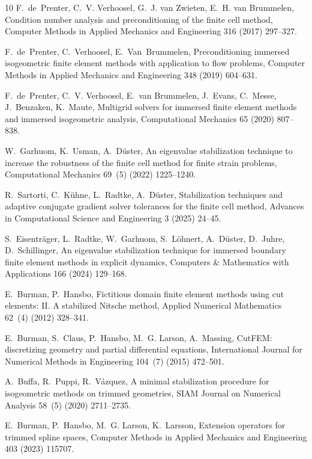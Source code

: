 \documentclass{article}
\numberwithin{equation}{section}
\theoremstyle{definition}
\begin{document}
\begin{thebibliography}{10}
F.~de~Prenter, C.~V. Verhoosel, G.~J. van Zwieten, E.~H. van Brummelen, Condition number analysis and preconditioning of the finite cell method, Computer Methods in Applied Mechanics and Engineering 316 (2017) 297--327.

F.~de~Prenter, C.~Verhoosel, E.~Van~Brummelen, Preconditioning immersed isogeometric finite element methods with application to flow problems, Computer Methods in Applied Mechanics and Engineering 348 (2019) 604--631.

F.~de~Prenter, C.~V. Verhoosel, E.~van Brummelen, J.~Evans, C.~Messe, J.~Benzaken, K.~Maute, Multigrid solvers for immersed finite element methods and immersed isogeometric analysis, Computational Mechanics 65 (2020) 807--838.

W.~Garhuom, K.~Usman, A.~D{\"u}ster, An eigenvalue stabilization technique to increase the robustness of the finite cell method for finite strain problems, Computational Mechanics 69~(5) (2022) 1225--1240.

R.~Sartorti, C.~K{\"u}hne, L.~Radtke, A.~D{\"u}ster, Stabilization techniques and adaptive conjugate gradient solver tolerances for the finite cell method, Advances in Computational Science and Engineering 3 (2025) 24--45.

S.~Eisentr{\"a}ger, L.~Radtke, W.~Garhuom, S.~L{\"o}hnert, A.~D{\"u}ster, D.~Juhre, D.~Schillinger, An eigenvalue stabilization technique for immersed boundary finite element methods in explicit dynamics, Computers \& Mathematics with Applications 166 (2024) 129--168.

E.~Burman, P.~Hansbo, Fictitious domain finite element methods using cut elements: {II}. {A} stabilized {Nitsche} method, Applied Numerical Mathematics 62~(4) (2012) 328--341.

E.~Burman, S.~Claus, P.~Hansbo, M.~G. Larson, A.~Massing, {CutFEM}: discretizing geometry and partial differential equations, International Journal for Numerical Methods in Engineering 104~(7) (2015) 472--501.

A.~Buffa, R.~Puppi, R.~V{\'a}zquez, A minimal stabilization procedure for isogeometric methods on trimmed geometries, SIAM Journal on Numerical Analysis 58~(5) (2020) 2711--2735.

E.~Burman, P.~Hansbo, M.~G. Larson, K.~Larsson, Extension operators for trimmed spline spaces, Computer Methods in Applied Mechanics and Engineering 403 (2023) 115707.


\end{thebibliography}
\end{document}
